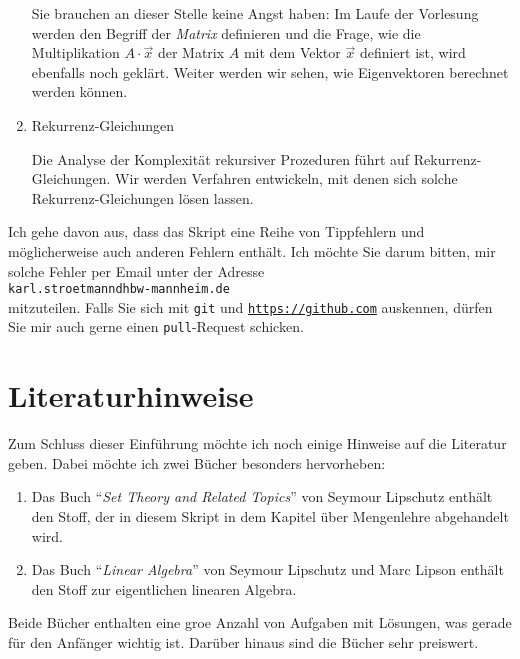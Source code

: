 \begin{enumerate}
      Sie brauchen an dieser Stelle keine Angst haben: Im Laufe der Vorlesung werden den Begriff der
      \emph{Matrix} definieren  und die Frage, wie die Multiplikation $A \cdot \vec{x}$ der Matrix $A$ mit
      dem Vektor $\vec{x}$ definiert ist, wird ebenfalls noch gekl\"{a}rt.  Weiter werden wir sehen,
      wie Eigenvektoren berechnet werden k\"{o}nnen.
\item Rekurrenz-Gleichungen

      Die Analyse der Komplexit\"{a}t rekursiver Prozeduren f\"{u}hrt auf Rekurrenz-Gleichungen.
      Wir werden Verfahren entwickeln, mit denen sich solche Rekurrenz-Gleichungen l\"{o}sen lassen.
\end{enumerate}
\remark
Ich gehe davon aus,  dass das  Skript eine Reihe von Tippfehlern und m\"{o}glicherweise auch anderen
Fehlern enth\"{a}lt.  Ich m\"{o}chte Sie darum bitten, mir solche Fehler per Email unter der Adresse 
\\[0.2cm]
\hspace*{1.3cm}
\texttt{karl.stroetmanndhbw-mannheim.de}
\\[0.2cm]
mitzuteilen.  Falls Sie sich mit \texttt{git} und \href{https://github.com}{\texttt{https://github.com}}
auskennen, d\"{u}rfen Sie mir auch gerne einen \texttt{pull}-Request schicken. 

\section{Literaturhinweise}
Zum Schluss dieser Einf\"{u}hrung m\"{o}chte ich noch einige Hinweise auf die Literatur geben.  Dabei m\"{o}chte
ich zwei B\"{u}cher besonders hervorheben:
\begin{enumerate}
\item Das Buch ``\emph{Set Theory and Related Topics}'' von Seymour Lipschutz \cite{lipschutz:1998} enth\"{a}lt den Stoff, der
      in diesem Skript in dem Kapitel \"{u}ber Mengenlehre abgehandelt wird.
\item Das Buch ``\emph{Linear Algebra}'' von Seymour Lipschutz und Marc Lipson \cite{lipschutz:2012}
      enth\"{a}lt den Stoff zur eigentlichen linearen Algebra.
\end{enumerate}
Beide B\"{u}cher enthalten eine gro\3e Anzahl von Aufgaben mit L\"{o}sungen, was gerade f\"{u}r den Anf\"{a}nger
wichtig ist.  Dar\"{u}ber hinaus sind die B\"{u}cher
sehr preiswert.  

